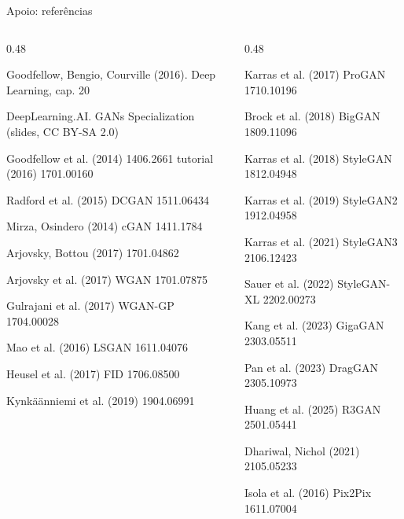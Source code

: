 \documentclass[aspectratio=169,t]{beamer}
\begin{document}
\begin{frame}{Apoio: referências}
  \begin{columns}[T,onlytextwidth]
    \begin{column}{0.48\textwidth}\raggedright\tiny
      Goodfellow, Bengio, Courville (2016). Deep Learning, cap. 20\par\smallskip
      DeepLearning.AI. GANs Specialization (slides, CC BY-SA 2.0)\par\smallskip
      Goodfellow et al. (2014) 1406.2661 \textperiodcentered{} tutorial (2016) 1701.00160\par\smallskip
      Radford et al. (2015) DCGAN 1511.06434\par\smallskip
      Mirza, Osindero (2014) cGAN 1411.1784\par\smallskip
      Arjovsky, Bottou (2017) 1701.04862\par\smallskip
      Arjovsky et al. (2017) WGAN 1701.07875\par\smallskip
      Gulrajani et al. (2017) WGAN-GP 1704.00028\par\smallskip
      Mao et al. (2016) LSGAN 1611.04076\par\smallskip
      Heusel et al. (2017) FID 1706.08500\par\smallskip
      Kynkäänniemi et al. (2019) 1904.06991\par\smallskip
    \end{column}
    \begin{column}{0.48\textwidth}\raggedright\tiny
      Karras et al. (2017) ProGAN 1710.10196\par\smallskip
      Brock et al. (2018) BigGAN 1809.11096\par\smallskip
      Karras et al. (2018) StyleGAN 1812.04948\par\smallskip
      Karras et al. (2019) StyleGAN2 1912.04958\par\smallskip
      Karras et al. (2021) StyleGAN3 2106.12423\par\smallskip
      Sauer et al. (2022) StyleGAN-XL 2202.00273\par\smallskip
      Kang et al. (2023) GigaGAN 2303.05511\par\smallskip
      Pan et al. (2023) DragGAN 2305.10973\par\smallskip
      Huang et al. (2025) R3GAN 2501.05441\par\smallskip
      Dhariwal, Nichol (2021) 2105.05233\par\smallskip
      Isola et al. (2016) Pix2Pix 1611.07004\par\smallskip

\end{column}
\end{columns}
\end{frame}
\end{document}
